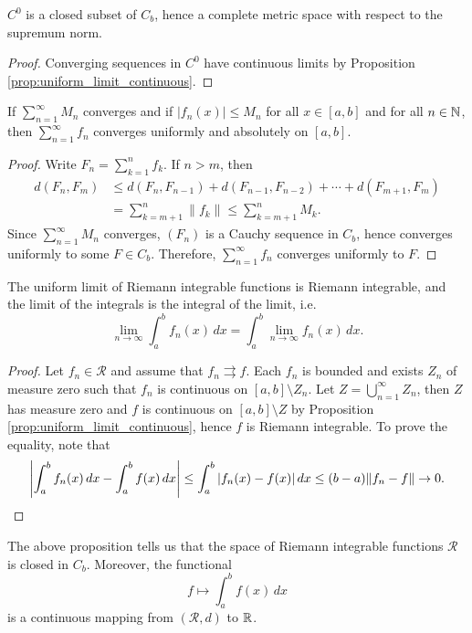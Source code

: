 \begin{cl}
    $C^0$ is a closed subset of $C_b$, hence a complete metric space with respect to the supremum norm.
    \begin{proof}
        Converging sequences in $C^0$ have continuous limits by Proposition \ref{prop:uniform_limit_continuous}.
    \end{proof}
\end{cl}

\begin{prop}
    If $\sum_{n=1}^\infty M_n$ converges and if $|f_n(x)| \leq M_n$ for all $x \in [a, b]$ and for all $n \in {\mathbb N}$, then $\sum_{n=1}^\infty f_n$ converges uniformly and absolutely on $[a, b]$.
    \begin{proof}
        Write $F_n = \sum_{k=1}^n f_k$. If $n > m$, then
        \begin{align*}
            d(F_n, F_m) &\leq d(F_n, F_{n-1}) + d(F_{n-1}, F_{n-2}) + \cdots + d(F_{m+1}, F_m) \\
            &= \sum_{k=m+1}^n \|f_k\| \leq \sum_{k=m+1}^n M_k.
        \end{align*}
        Since $\sum_{n=1}^\infty M_n$ converges, $(F_n)$ is a Cauchy sequence in $C_b$, hence converges uniformly to some $F \in C_b$. Therefore, $\sum_{n=1}^\infty f_n$ converges uniformly to $F$.
    \end{proof}
\end{prop}

\begin{prop}
    The uniform limit of Riemann integrable functions is Riemann integrable, and the limit of the integrals is the integral of the limit, i.e.
    \[
    \lim_{n \to \infty} \int_a^b f_n(x) \, dx = \int_a^b \lim_{n \to \infty} f_n(x) \, dx.
    \]
    \begin{proof}
        Let $f_n \in \mathcal R$ and assume that $f_n \rightrightarrows f$. Each $f_n$ is bounded and exists $Z_n$ of measure zero such that $f_n$ is continuous on $[a, b] \setminus Z_n$. Let $Z = \bigcup_{n=1}^\infty Z_n$, then $Z$ has measure zero and $f$ is continuous on $[a, b] \setminus Z$ by Proposition \ref{prop:uniform_limit_continuous}, hence $f$ is Riemann integrable. To prove the equality, note that
        \[
        {\left| \int_a^b f_n(x) \, dx - \int_a^b f(x) \, dx \right|} \leq \int_a^b |f_n(x) - f(x)| \, dx \leq (b - a) \|f_n - f\| \to 0.
        \]
    \end{proof}
\end{prop}

The above proposition tells us that the space of Riemann integrable functions $\mathcal R$ is closed in $C_b$. Moreover, the functional
\[
f \mapsto \int_a^b f(x) \, dx
\]
is a continuous mapping from $(\mathcal R, d)$ to ${\mathbb R}$.

